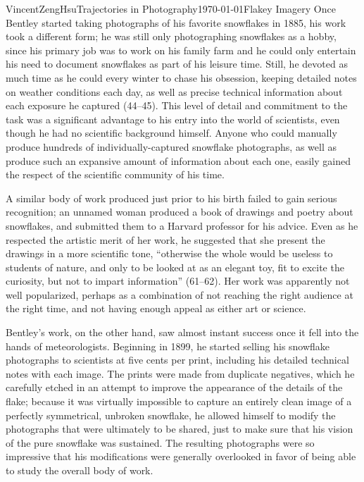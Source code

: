 \documentclass{article}[12pt]
\begin{document}
\begin{mla}{Vincent}{Zeng}{Hsu}{Trajectories in Photography}{\today}{Flakey Imagery}
Once Bentley started taking photographs of his favorite snowflakes in 1885, his work took a different form; he was still only photographing snowflakes as a hobby, since his primary job was to work on his family farm and he could only entertain his need to document snowflakes as part of his leisure time. Still, he devoted as much time as he could every winter to chase his obsession, keeping detailed notes on weather conditions each day, as well as precise technical information about each exposure he captured (44--45). This level of detail and commitment to the task was a significant advantage to his entry into the world of scientists, even though he had no scientific background himself. Anyone who could manually produce hundreds of individually-captured snowflake photographs, as well as produce such an expansive amount of information about each one, easily gained the respect of the scientific community of his time.

A similar body of work produced just prior to his birth failed to gain serious recognition; an unnamed woman produced a book of drawings and poetry about snowflakes, and submitted them to a Harvard professor for his advice. Even as he respected the artistic merit of her work, he suggested that she present the drawings in a more scientific tone, ``otherwise the whole would be useless to students of nature, and only to be looked at as an elegant toy, fit to excite the curiosity, but not to impart information'' (61--62). Her work was apparently not well popularized, perhaps as a combination of not reaching the right audience at the right time, and not having enough appeal as either art or science.

Bentley's work, on the other hand, saw almost instant success once it fell into the hands of meteorologists. Beginning in 1899, he started selling his snowflake photographs to scientists at five cents per print, including his detailed technical notes with each image. The prints were made from duplicate negatives, which he carefully etched in an attempt to improve the appearance of the details of the flake; because it was virtually impossible to capture an entirely clean image of a perfectly symmetrical, unbroken snowflake, he allowed himself to modify the photographs that were ultimately to be shared, just to make sure that his vision of the pure snowflake was sustained. The resulting photographs were so impressive that his modifications were generally overlooked in favor of being able to study the overall body of work.


\end{mla}
\end{document}
